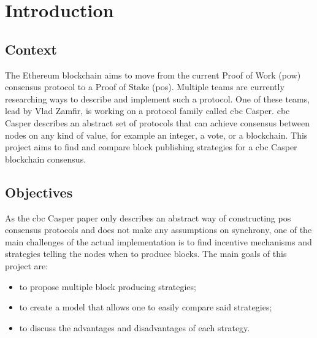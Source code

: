 \chapter{Introduction}
\label{chap:introduction}

\section{Context}

The Ethereum blockchain aims to move from the current Proof of Work (\gls{pow})
consensus protocol to a Proof of Stake (\gls{pos}). Multiple teams are
currently researching ways to describe and implement such a protocol. One of
these teams, lead by Vlad Zamfir, is working on a protocol family called
\gls{cbc} Casper.  \gls{cbc} Casper describes an abstract set of protocols that
can achieve consensus between nodes on any kind of value, for example an integer, a vote,
or a blockchain. This project aims to find and compare block publishing
strategies for a \gls{cbc} Casper blockchain consensus.

\section{Objectives}
As the \gls{cbc} Casper paper only describes an abstract way of constructing
\gls{pos} consensus protocols and does not make any assumptions on synchrony,
one of the main challenges of the actual implementation is to find incentive
mechanisms and strategies telling the nodes when to produce blocks.  The main
goals of this project are:

\begin{itemize}
        \item to propose multiple block producing strategies;
        \item to create a model that allows one to easily compare said strategies;
        \item to discuss the advantages and disadvantages of each strategy.
\end{itemize}
